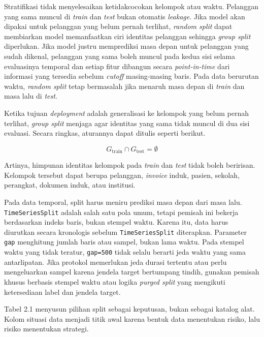 Stratifikasi tidak menyelesaikan ketidakcocokan kelompok atau waktu. Pelanggan yang sama muncul di \emph{train} dan \emph{test} bukan otomatis \emph{leakage}. Jika model akan dipakai untuk pelanggan yang belum pernah terlihat, \emph{random split} dapat membiarkan model memanfaatkan ciri identitas pelanggan sehingga \emph{group split} diperlukan. Jika model justru memprediksi masa depan untuk pelanggan yang sudah dikenal, pelanggan yang sama boleh muncul pada kedua sisi selama evaluasinya temporal dan setiap fitur dibangun secara \emph{point-in-time} dari informasi yang tersedia sebelum \emph{cutoff} masing-masing baris. Pada data berurutan waktu, \emph{random split} tetap bermasalah jika menaruh masa depan di \emph{train} dan masa lalu di \emph{test}.

Ketika tujuan \emph{deployment} adalah generalisasi ke kelompok yang belum pernah terlihat, \emph{group split} menjaga agar identitas yang sama tidak muncul di dua sisi evaluasi. Secara ringkas, aturannya dapat ditulis seperti berikut.

\[
G_{\text{train}} \cap G_{\text{test}} = \emptyset
\]

Artinya, himpunan identitas kelompok pada \emph{train} dan \emph{test} tidak boleh beririsan. Kelompok tersebut dapat berupa pelanggan, \emph{invoice} induk, pasien, sekolah, perangkat, dokumen induk, atau institusi.

Pada data temporal, split harus meniru prediksi masa depan dari masa lalu. \passthrough{\lstinline!TimeSeriesSplit!} adalah salah satu pola umum, tetapi pemisah ini bekerja berdasarkan indeks baris, bukan stempel waktu. Karena itu, data harus diurutkan secara kronologis sebelum \passthrough{\lstinline!TimeSeriesSplit!} diterapkan. Parameter \passthrough{\lstinline!gap!} menghitung jumlah baris atau sampel, bukan lama waktu. Pada stempel waktu yang tidak teratur, \passthrough{\lstinline!gap=500!} tidak selalu berarti jeda waktu yang sama antarlipatan. Jika protokol memerlukan jeda durasi tertentu atau perlu mengeluarkan sampel karena jendela target bertumpang tindih, gunakan pemisah khusus berbasis stempel waktu atau logika \emph{purged split} yang mengikuti ketersediaan label dan jendela target.

Tabel 2.1 menyusun pilihan split sebagai keputusan, bukan sebagai katalog alat. Kolom situasi data menjadi titik awal karena bentuk data menentukan risiko, lalu risiko menentukan strategi.


